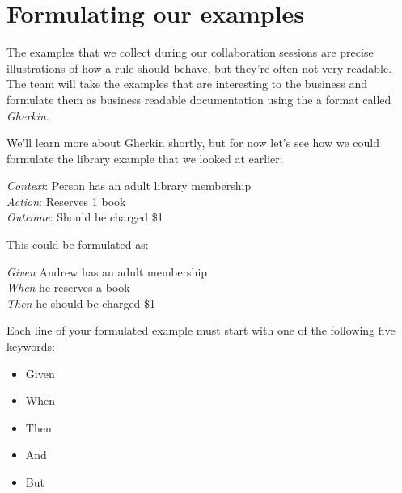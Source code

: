 \chapter*{Formulating our examples}

The examples that we collect during our collaboration sessions are precise illustrations of how a rule should behave, but they're often not very readable. The team will take the examples that are interesting to the business and formulate them as business readable documentation using the a format called \emph{Gherkin}.

We'll learn more about Gherkin shortly, but for now let's see how we could formulate the library example that we looked at earlier:

\hspace*{1cm} \emph{Context}: Person has an adult library membership \\
\hspace*{1cm} \emph{Action}: Reserves 1 book \\
\hspace*{1cm} \emph{Outcome}: Should be charged \$1

This could be formulated as:

\hspace*{1cm} \emph{Given} Andrew has an adult membership \\
\hspace*{1cm} \emph{When} he reserves a book \\
\hspace*{1cm} \emph{Then} he should be charged \$1

Each line of your formulated example must start with one of the following five keywords:

\begin{itemize}
    \item Given
    \item When
    \item Then
    \item And
    \item But
\end{itemize}

